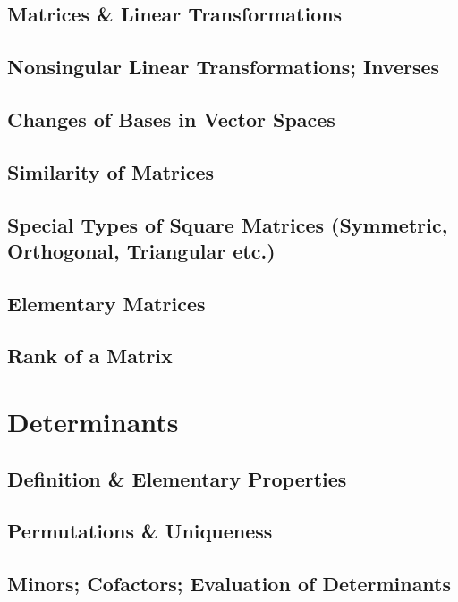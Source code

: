 \documentclass[11pt]{article}
\theoremstyle{definition}
\theoremstyle{plain}
\theoremstyle{remark}
\begin{document}
\subsection{Matrices \& Linear Transformations}

\subsection{Nonsingular Linear Transformations; Inverses}

\subsection{Changes of Bases in Vector Spaces}

\subsection{Similarity of Matrices}

\subsection{Special Types of Square Matrices (Symmetric, Orthogonal, Triangular etc.)}

\subsection{Elementary Matrices}

\subsection{Rank of a Matrix}

\section{Determinants}

\subsection{Definition \& Elementary Properties}

\subsection{Permutations \& Uniqueness}

\subsection{Minors; Cofactors; Evaluation of Determinants}
\end{document}
